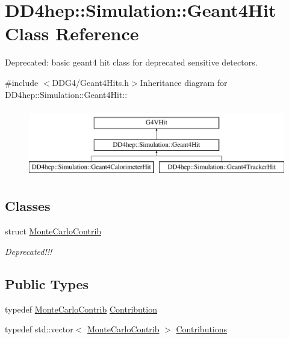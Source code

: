 \hypertarget{class_d_d4hep_1_1_simulation_1_1_geant4_hit}{
\section{DD4hep::Simulation::Geant4Hit Class Reference}
\label{class_d_d4hep_1_1_simulation_1_1_geant4_hit}
}


Deprecated: basic geant4 hit class for deprecated sensitive detectors.  


{\ttfamily \#include $<$DDG4/Geant4Hits.h$>$}Inheritance diagram for DD4hep::Simulation::Geant4Hit::\begin{figure}[H]
\begin{center}
\leavevmode
\includegraphics[height=3cm]{class_d_d4hep_1_1_simulation_1_1_geant4_hit}
\end{center}
\end{figure}
\subsection*{Classes}
\begin{DoxyCompactItemize}
\item 
struct \hyperlink{struct_d_d4hep_1_1_simulation_1_1_geant4_hit_1_1_monte_carlo_contrib}{MonteCarloContrib}
\begin{DoxyCompactList}\small\item\em Deprecated!!! \item\end{DoxyCompactList}\end{DoxyCompactItemize}
\subsection*{Public Types}
\begin{DoxyCompactItemize}
\item 
typedef \hyperlink{struct_d_d4hep_1_1_simulation_1_1_geant4_hit_1_1_monte_carlo_contrib}{MonteCarloContrib} \hyperlink{class_d_d4hep_1_1_simulation_1_1_geant4_hit_a03a5270c4d1410302fe278ce6a47f268}{Contribution}
\item 
typedef std::vector$<$ \hyperlink{struct_d_d4hep_1_1_simulation_1_1_geant4_hit_1_1_monte_carlo_contrib}{MonteCarloContrib} $>$ \hyperlink{class_d_d4hep_1_1_simulation_1_1_geant4_hit_acdc278ce7e641d337b024d5fc8f52a2c}{Contributions}
\end{DoxyCompactItemize}

